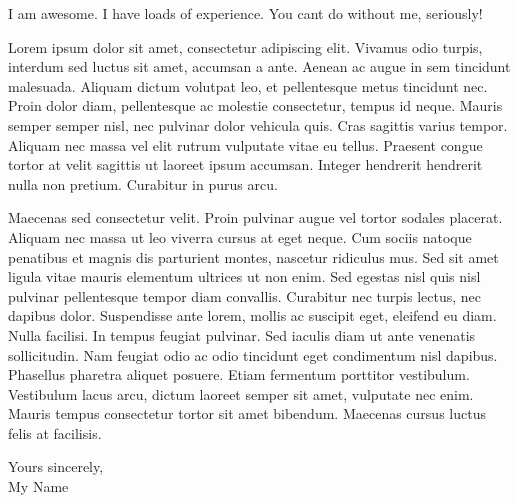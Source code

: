 \documentclass[10pt]{article}
\begin{document}
\begin{spacing}{1.2}
I am awesome. I have loads of experience. You cant do without me, seriously!

Lorem ipsum dolor sit amet, consectetur adipiscing elit. Vivamus odio turpis, interdum sed luctus sit amet, accumsan a ante. Aenean ac augue in sem tincidunt malesuada. Aliquam dictum volutpat leo, et pellentesque metus tincidunt nec. Proin dolor diam, pellentesque ac molestie consectetur, tempus id neque. Mauris semper semper nisl, nec pulvinar dolor vehicula quis. Cras sagittis varius tempor. Aliquam nec massa vel elit rutrum vulputate vitae eu tellus. Praesent congue tortor at velit sagittis ut laoreet ipsum accumsan. Integer hendrerit hendrerit nulla non pretium. Curabitur in purus arcu.

Maecenas sed consectetur velit. Proin pulvinar augue vel tortor sodales placerat. Aliquam nec massa ut leo viverra cursus at eget neque. Cum sociis natoque penatibus et magnis dis parturient montes, nascetur ridiculus mus. Sed sit amet ligula vitae mauris elementum ultrices ut non enim. Sed egestas nisl quis nisl pulvinar pellentesque tempor diam convallis. Curabitur nec turpis lectus, nec dapibus dolor. Suspendisse ante lorem, mollis ac suscipit eget, eleifend eu diam. Nulla facilisi. In tempus feugiat pulvinar. Sed iaculis diam ut ante venenatis sollicitudin. Nam feugiat odio ac odio tincidunt eget condimentum nisl dapibus. Phasellus pharetra aliquet posuere. Etiam fermentum porttitor vestibulum. Vestibulum lacus arcu, dictum laoreet semper sit amet, vulputate nec enim. Mauris tempus consectetur tortor sit amet bibendum. Maecenas cursus luctus felis at facilisis.

\vspace{0.5cm}Yours sincerely,\\[0.2cm]
My Name

\end{spacing}
\end{document}
